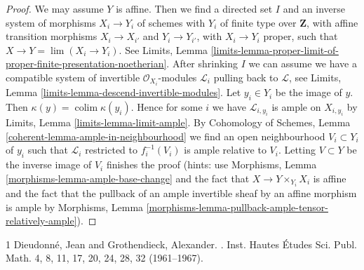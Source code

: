 \documentclass[10pt,a4paper]{amsart}
\theoremstyle{plain}
\theoremstyle{definition}
\theoremstyle{remark}
\numberwithin{equation}{subsection}
\def\lim{\mathop{\mathrm{lim}}\nolimits}
\def\colim{\mathop{\mathrm{colim}}\nolimits}
\begin{document}
\begin{proof}
We may assume $Y$ is affine. Then we find a directed set $I$
and an inverse system of morphisms $X_i \to Y_i$ of schemes
with $Y_i$ of finite type over $\mathbf{Z}$, with affine
transition morphisms $X_i \to X_{i'}$ and $Y_i \to Y_{i'}$,
with $X_i \to Y_i$ proper, such that $X \to Y = \lim (X_i \to Y_i)$.
See Limits, Lemma
\ref{limits-lemma-proper-limit-of-proper-finite-presentation-noetherian}.
After shrinking $I$ we can assume we have a compatible system of
invertible $\mathcal{O}_{X_i}$-modules $\mathcal{L}_i$
pulling back to $\mathcal{L}$, see
Limits, Lemma \ref{limits-lemma-descend-invertible-modules}.
Let $y_i \in Y_i$ be the image of $y$.
Then $\kappa(y) = \colim \kappa(y_i)$.
Hence for some $i$ we have $\mathcal{L}_{i, y_i}$
is ample on $X_{i, y_i}$ by
Limits, Lemma \ref{limits-lemma-limit-ample}.
By Cohomology of Schemes, Lemma \ref{coherent-lemma-ample-in-neighbourhood}
we find an open neighbourhood
$V_i \subset Y_i$ of $y_i$ such that
$\mathcal{L}_i$ restricted to $f_i^{-1}(V_i)$
is ample relative to $V_i$.
Letting $V \subset Y$ be the inverse image of
$V_i$ finishes the proof (hints: use
Morphisms, Lemma \ref{morphisms-lemma-ample-base-change} and
the fact that $X \to Y \times_{Y_i} X_i$ is affine
and the fact that the pullback of an
ample invertible sheaf by an affine morphism is ample by
Morphisms, Lemma \ref{morphisms-lemma-pullback-ample-tensor-relatively-ample}).
\end{proof}

\begin{thebibliography}{1}
Dieudonn{\'e}, Jean and Grothendieck, Alexander.
.
\newblock Inst. Hautes {\'E}tudes Sci. Publ. Math. 4, 8, 11, 17, 20, 24, 28, 32 (1961--1967).
\end{thebibliography}
\end{document}
